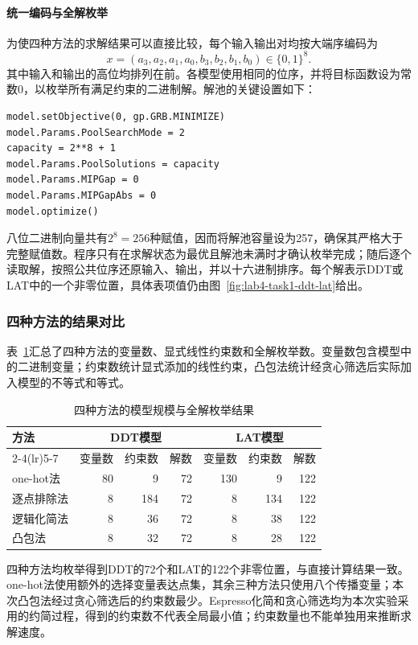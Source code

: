 \paragraph{统一编码与全解枚举}

为使四种方法的求解结果可以直接比较，每个输入输出对均按大端序编码为
\[
x=(a_3,a_2,a_1,a_0,b_3,b_2,b_1,b_0)\in\{0,1\}^8.
\]
其中输入和输出的高位均排列在前。各模型使用相同的位序，并将目标函数设为常数0，以枚举所有满足约束的二进制解。解池的关键设置如下：
\begin{lstlisting}
model.setObjective(0, gp.GRB.MINIMIZE)
model.Params.PoolSearchMode = 2
capacity = 2**8 + 1
model.Params.PoolSolutions = capacity
model.Params.MIPGap = 0
model.Params.MIPGapAbs = 0
model.optimize()
\end{lstlisting}

八位二进制向量共有$2^8=256$种赋值，因而将解池容量设为257，确保其严格大于完整赋值数。程序只有在求解状态为最优且解池未满时才确认枚举完成；随后逐个读取解，按照公共位序还原输入、输出，并以十六进制排序。每个解表示DDT或LAT中的一个非零位置，具体表项值仍由图~\ref{fig:lab4-task1-ddt-lat}给出。






\clearpage
\subsubsection{四种方法的结果对比}

表~\ref{tab:lab4-task1-comparison}汇总了四种方法的变量数、显式线性约束数和全解枚举数。变量数包含模型中的二进制变量；约束数统计显式添加的线性约束，凸包法统计经贪心筛选后实际加入模型的不等式和等式。

\begin{table}[H]
    \centering
    \caption{四种方法的模型规模与全解枚举结果}
    \label{tab:lab4-task1-comparison}
    \begin{tabular}{lrrrrrr}
        \toprule
        \multirow{2}{*}{方法} & \multicolumn{3}{c}{DDT模型} & \multicolumn{3}{c}{LAT模型} \\
        \cmidrule(lr){2-4}\cmidrule(lr){5-7}
        & 变量数 & 约束数 & 解数 & 变量数 & 约束数 & 解数 \\
        \midrule
        one-hot法 & 80 & 9 & 72 & 130 & 9 & 122 \\
        逐点排除法 & 8 & 184 & 72 & 8 & 134 & 122 \\
        逻辑化简法 & 8 & 36 & 72 & 8 & 38 & 122 \\
        凸包法 & 8 & 32 & 72 & 8 & 28 & 122 \\
        \bottomrule
    \end{tabular}
\end{table}

四种方法均枚举得到DDT的72个和LAT的122个非零位置，与直接计算结果一致。one-hot法使用额外的选择变量表达点集，其余三种方法只使用八个传播变量；本次凸包法经过贪心筛选后的约束数最少。Espresso化简和贪心筛选均为本次实验采用的约简过程，得到的约束数不代表全局最小值；约束数量也不能单独用来推断求解速度。
